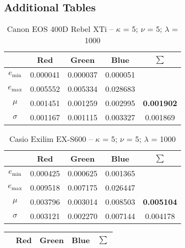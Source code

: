 \begin{appendix}
%
%
%
\chapter{Additional Tables}
\label{chap:additionalTables}
\begin{table}[htb]
  \centering
    \begin{tabular}{|c||c|c|c|c|}\hline
		   & \textbf{Red} & \textbf{Green} & \textbf{Blue} & \textbf{$\sum$} \\\hline\hline
      $e_\text{min}$ & 0.000041 & 0.000037 & 0.000051 &   \\\hline
      $e_\text{max}$ & 0.005552 & 0.005334 & 0.028683 &   \\\hline
      $\mu$          & 0.001451 & 0.001259 & 0.002995 & \textbf{0.001902} \\\hline
      $\sigma$       & 0.001167 & 0.001115 & 0.003327 & 0.001869 \\\hline
    \end{tabular}
  \caption{Canon EOS 400D Rebel XTi -- $\kappa$ = 5; $\nu$ = 5; $\lambda$ = 1000}
  \label{tab:Canon EOS 400D Rebel XTi551000}
\end{table}
\begin{table}[htb]
  \centering
    \begin{tabular}{|c||c|c|c|c|}\hline
		   & \textbf{Red} & \textbf{Green} & \textbf{Blue} & \textbf{$\sum$} \\\hline\hline
      $e_\text{min}$ & 0.000425 & 0.000625 & 0.001365 &   \\\hline
      $e_\text{max}$ & 0.009518 & 0.007175 & 0.026447 &   \\\hline
      $\mu$          & 0.003796 & 0.003014 & 0.008503 & \textbf{0.005104} \\\hline
      $\sigma$       & 0.003121 & 0.002270 & 0.007144 & 0.004178 \\\hline
    \end{tabular}
  \caption{Casio Exilim EX-S600 -- $\kappa$ = 5; $\nu$ = 5; $\lambda$ = 1000}
  \label{tab:Casio Exilim EX-S600551000}
\end{table}
\begin{table}[htb]
  \centering
    \begin{tabular}{|c||c|c|c|c|}\hline
		   & \textbf{Red} & \textbf{Green} & \textbf{Blue} & \textbf{$\sum$} \\\hline\hline

\end{tabular}
\end{table}
\end{appendix}

